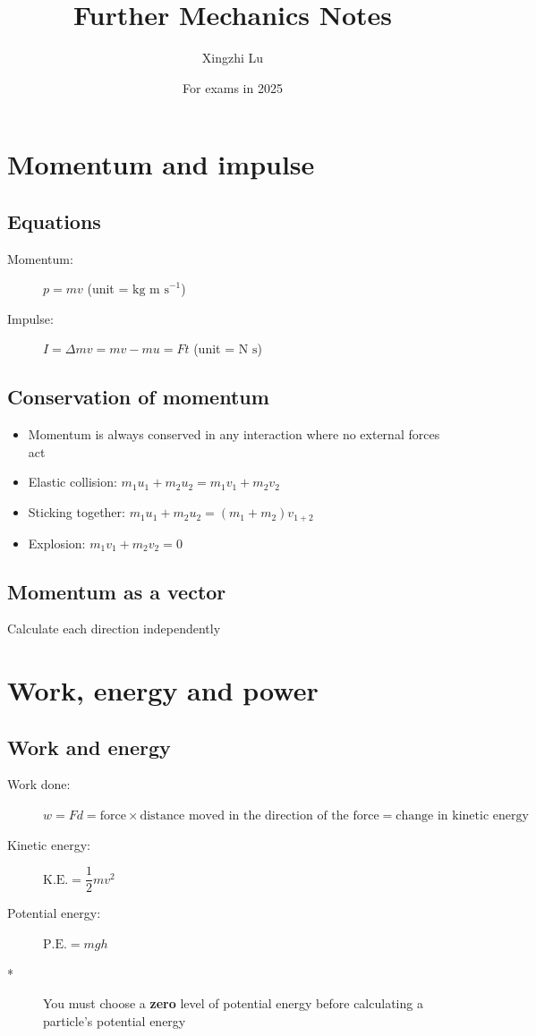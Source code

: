 \documentclass[11pt, A4paper]{article}
\title{Further Mechanics Notes}
\author{Xingzhi Lu}
\date{For exams in 2025}
\begin{document}
	\maketitle
	
	\section[1 Momentum and impulse]{Momentum and impulse}
	\subsection{Equations}
	\begin{description}
		\item[Momentum:] $p=mv$ (unit = $\text{kg m s}^{-1}$)
		\item[Impulse:] $I=\Delta mv=mv-mu=Ft$ (unit = $\text{N s}$)
	\end{description}
	
	\subsection{Conservation of momentum}
	\begin{itemize}
		\item Momentum is always conserved in any interaction where no external forces act
		\item Elastic collision: $m_1u_1+m_2u_2=m_1v_1+m_2v_2$
		\item Sticking together: $m_1u_1+m_2u_2=(m_1+m_2)v_{1+2}$
		\item Explosion: $m_1v_1+m_2v_2=0$
	\end{itemize}
	
	\subsection{Momentum as a vector}
	Calculate each direction independently
	
	
	
	\section[2 Work, energy and power]{Work, energy and power}
	\subsection{Work and energy}
	\begin{description}
		\item[Work done:] $w=Fd=\text{force}\times\text{distance moved in the direction of the force}=\text{change in kinetic energy}$
		\item[Kinetic energy:] $\text{K.E.}=\dfrac{1}{2}mv^2$
		\item[Potential energy:] $\text{P.E.}=mgh$
		\item[*] You must choose a \textbf{zero} level of potential energy before calculating a particle's potential energy
	\end{description}
	
\end{document}
